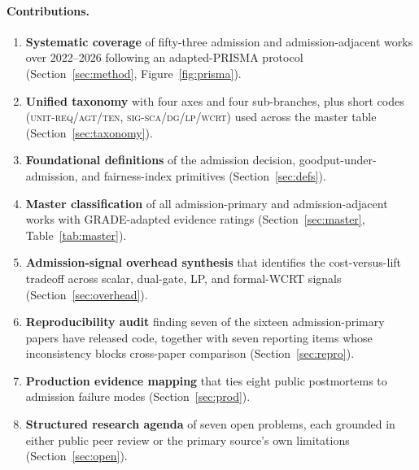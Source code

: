 \documentclass[11pt,letterpaper]{article}
\theoremstyle{definition}
\begin{document}
\paragraph{Contributions.}
\begin{enumerate}[leftmargin=1.5em, itemsep=2pt]
\item \textbf{Systematic coverage} of fifty-three admission and
      admission-adjacent works over 2022--2026 following an
      adapted-PRISMA protocol (Section~\ref{sec:method},
      Figure~\ref{fig:prisma}).
\item \textbf{Unified taxonomy} with four axes and four sub-branches,
      plus short codes (\textsc{unit-req/agt/ten},
      \textsc{sig-sca/dg/lp/wcrt}) used across the master table
      (Section~\ref{sec:taxonomy}).
\item \textbf{Foundational definitions} of the admission decision,
      goodput-under-admission, and fairness-index primitives
      (Section~\ref{sec:defs}).
\item \textbf{Master classification} of all admission-primary and
      admission-adjacent works with GRADE-adapted evidence ratings
      (Section~\ref{sec:master}, Table~\ref{tab:master}).
\item \textbf{Admission-signal overhead synthesis} that identifies the
      cost-versus-lift tradeoff across scalar, dual-gate, LP, and
      formal-WCRT signals (Section~\ref{sec:overhead}).
\item \textbf{Reproducibility audit} finding seven of the sixteen
      admission-primary papers have released code, together with seven
      reporting items whose inconsistency blocks cross-paper comparison
      (Section~\ref{sec:repro}).
\item \textbf{Production evidence mapping} that ties eight public
      postmortems to admission failure modes (Section~\ref{sec:prod}).
\item \textbf{Structured research agenda} of seven open problems, each
      grounded in either public peer review or the primary source's
      own limitations (Section~\ref{sec:open}).
\end{enumerate}
\end{document}
